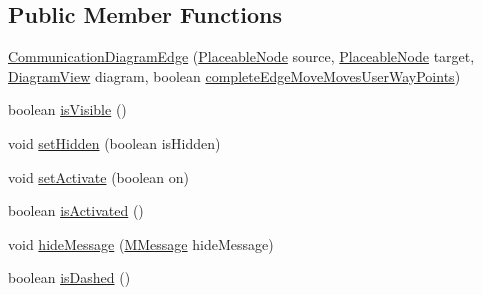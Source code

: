 \subsection*{Public Member Functions}
\begin{DoxyCompactItemize}
\item 
\hyperlink{classorg_1_1tzi_1_1use_1_1gui_1_1views_1_1diagrams_1_1behavior_1_1communicationdiagram_1_1_communication_diagram_edge_a89205b861fa1ae78e371d5243cccec33}{Communication\-Diagram\-Edge} (\hyperlink{classorg_1_1tzi_1_1use_1_1gui_1_1views_1_1diagrams_1_1elements_1_1_placeable_node}{Placeable\-Node} source, \hyperlink{classorg_1_1tzi_1_1use_1_1gui_1_1views_1_1diagrams_1_1elements_1_1_placeable_node}{Placeable\-Node} target, \hyperlink{classorg_1_1tzi_1_1use_1_1gui_1_1views_1_1diagrams_1_1_diagram_view}{Diagram\-View} diagram, boolean \hyperlink{classorg_1_1tzi_1_1use_1_1gui_1_1views_1_1diagrams_1_1elements_1_1edges_1_1_edge_base_ad97a3ce3074b08b65550e796d09f8e42}{complete\-Edge\-Move\-Moves\-User\-Way\-Points})
\item 
boolean \hyperlink{classorg_1_1tzi_1_1use_1_1gui_1_1views_1_1diagrams_1_1behavior_1_1communicationdiagram_1_1_communication_diagram_edge_ad6451c296057ce605e2cdf706bcf731a}{is\-Visible} ()
\item 
void \hyperlink{classorg_1_1tzi_1_1use_1_1gui_1_1views_1_1diagrams_1_1behavior_1_1communicationdiagram_1_1_communication_diagram_edge_a22866afde2575f6b90c0cf46e7424a91}{set\-Hidden} (boolean is\-Hidden)
\item 
void \hyperlink{classorg_1_1tzi_1_1use_1_1gui_1_1views_1_1diagrams_1_1behavior_1_1communicationdiagram_1_1_communication_diagram_edge_a06b8ca820512ece3416c46da303538ec}{set\-Activate} (boolean on)
\item 
boolean \hyperlink{classorg_1_1tzi_1_1use_1_1gui_1_1views_1_1diagrams_1_1behavior_1_1communicationdiagram_1_1_communication_diagram_edge_a3c4a7ce7e0444fa8b45deac6f6715cf1}{is\-Activated} ()
\item 
void \hyperlink{classorg_1_1tzi_1_1use_1_1gui_1_1views_1_1diagrams_1_1behavior_1_1communicationdiagram_1_1_communication_diagram_edge_a7ef65b1ec9040bd4a71d4f00ba90445f}{hide\-Message} (\hyperlink{classorg_1_1tzi_1_1use_1_1gui_1_1views_1_1diagrams_1_1behavior_1_1communicationdiagram_1_1_m_message}{M\-Message} hide\-Message)
\item 
boolean \hyperlink{classorg_1_1tzi_1_1use_1_1gui_1_1views_1_1diagrams_1_1behavior_1_1communicationdiagram_1_1_communication_diagram_edge_a40a37c575025710fd8fad172db5f278a}{is\-Dashed} ()

\end{DoxyCompactItemize}
